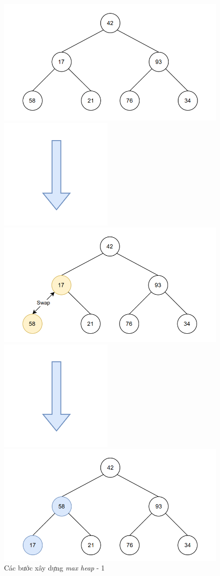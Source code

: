 \begin{figure}[H]
    \centering
    \includegraphics[width=0.5\linewidth]{img/heap_sort/1.png}
    \vspace{0.01cm}

    \includegraphics[width=0.1\linewidth]{img/heap_sort/arrow.png}
    \vspace{0.01cm}

    \includegraphics[width=0.5\linewidth]{img/heap_sort/2.png}
    \vspace{0.01cm}

    \includegraphics[width=0.1\linewidth]{img/heap_sort/arrow.png}
    \vspace{0.01cm}

    \includegraphics[width=0.5\linewidth]{img/heap_sort/3.png}

    \caption{Các bước xây dựng \textit{max heap} - 1}
\end{figure}

